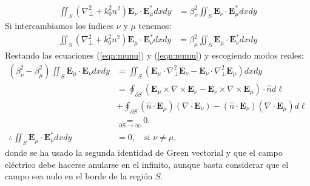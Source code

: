 \begin{align}
	 \iint_S \left(  \nabla_\perp^2  + k_0^2n^2 \right)\textbf{E}_\nu \cdot\textbf{E}_\mu^* dxdy &= \beta_\nu^2 \iint_S \textbf{E}_\nu \cdot\textbf{E}_\mu^* dxdy \label{eqn:munu}
\end{align}
Si intercambiamos los índices $\nu$ y $\mu$ tenemos:
\begin{align}
	 	\iint_S \left(  \nabla_\perp^2  + k_0^2n^2 \right)\textbf{E}_\mu \cdot\textbf{E}_\nu^* dxdy &= \beta_\mu^2 \iint_S \textbf{E}_\mu \cdot\textbf{E}_\nu^* dxdy \label{eqn:numu}
\end{align}
Restando las ecuaciones (\ref{eqn:munu}) y (\ref{eqn:numu}) y escogiendo modos reales:
\begin{align*}
	 	  (\beta_\nu^2-\beta_\mu^2)\iint_S\textbf{E}_\mu \cdot\textbf{E}_\nu dxdy &=  \iint_S \left(\textbf{E}_\mu   \cdot\nabla_\perp^2 \textbf{E}_\nu - \textbf{E}_\nu   \cdot\nabla_\perp^2 \textbf{E}_\mu\right)  dxdy
		\nonumber	 	  
	 	  \\
	 	  &=
	 	  \oint_{\partial S} (\textbf{E}_\mu \times \nabla \times \textbf{E}_\nu - \textbf{E}_\nu \times \nabla \times \textbf{E}_\mu) \cdot \hat{n}d\ell
	 	  \nonumber
			\\	 	  
	 	  &+
	 	  \oint_{\partial S} (\hat{n}\cdot \textbf{E}_\mu)(\nabla\cdot \textbf{E}_\nu) - (\hat{n}\cdot \textbf{E}_\nu)(\nabla\cdot \textbf{E}_\mu) d\ell
	 	  \nonumber
	 	  \\
	 	  &\underset{\mathrm{\partial S \to \infty}}{=}  0.
	 	 \\
	 	 \therefore \iint_S\textbf{E}_\mu \cdot\textbf{E}_\nu^* dxdy &= 0, \quad \text{si } \nu\neq\mu,
\end{align*}
donde se ha usado la segunda identidad de Green vectorial \citep{greenvectorial} y que el campo eléctrico debe hacerse anularse en el infinito, aunque basta considerar que el campo sea nulo en el borde de la región $S$.